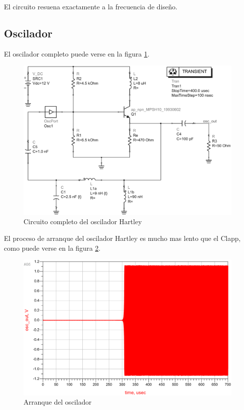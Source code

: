 \documentclass[journal]{IEEEtran}
\begin{document}
El circuito resuena exactamente a la frecuencia de diseño.

\subsection{Oscilador}

El oscilador completo puede verse en la figura \ref{fig:hartley_osc_sch}.

\begin{figure}[H]
\centering
\includegraphics[width=1\linewidth]{capturas/hartley_osc_sch-cropped.pdf}
\caption{Circuito completo del oscilador Hartley}
\label{fig:hartley_osc_sch}
\end{figure}

El proceso de arranque del oscilador Hartley es mucho mas lento que el Clapp, como puede verse en la figura \ref{fig:hartley_osc_trans}.

\begin{figure}[H]
\centering
\includegraphics[width=1\linewidth]{capturas/hartley_osc_trans-cropped.pdf}
\caption{Arranque del oscilador}
\label{fig:hartley_osc_trans}
\end{figure}
\end{document}

